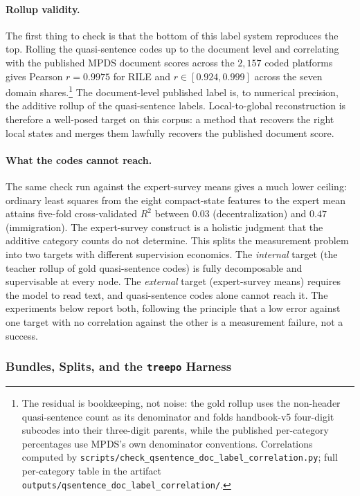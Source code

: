 \paragraph{Rollup validity.} The first thing to check is that the
bottom of this label system reproduces the top. Rolling the
quasi-sentence codes up to the document level and correlating with the
published MPDS document scores across the $2{,}157$ coded platforms
gives Pearson $r = 0.9975$ for RILE and $r \in [0.924, 0.999]$ across
the seven domain shares.\footnote{The residual is bookkeeping, not
noise: the gold rollup uses the non-header quasi-sentence count as its
denominator and folds handbook-v5 four-digit subcodes into their
three-digit parents, while the published per-category percentages use
MPDS's own denominator conventions. Correlations computed by
\texttt{scripts/check\_qsentence\_doc\_label\_correlation.py}; full
per-category table in the artifact
\texttt{outputs/qsentence\_doc\_label\_correlation/}.} The
document-level published label is, to numerical precision, the additive
rollup of the quasi-sentence labels. Local-to-global reconstruction is
therefore a well-posed target on this corpus: a method that recovers
the right local states and merges them lawfully recovers the published
document score.

\paragraph{What the codes cannot reach.} The same check run against
the \citet{BenoitEtAl2025} expert-survey means gives a much lower
ceiling: ordinary least squares from the eight compact-state features
to the expert mean attains five-fold cross-validated $R^2$ between
$0.03$ (decentralization) and $0.47$ (immigration). The expert-survey
construct is a holistic judgment that the additive category counts do
not determine. This splits the measurement problem into two targets
with different supervision economics. The \emph{internal} target (the
teacher rollup of gold quasi-sentence codes) is fully decomposable and
supervisable at every node. The \emph{external} target (expert-survey
means) requires the model to read text, and quasi-sentence codes alone
cannot reach it. The experiments below report both, following the
principle that a low error against one target with no correlation
against the other is a measurement failure, not a success.

\subsubsection{Bundles, Splits, and the \texttt{treepo} Harness}\label{sec:qsentence-harness}

